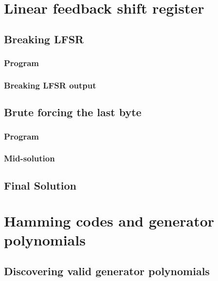 \documentclass[pdftex, 12pt, a4paper]{article}
\begin{document}
\pagebreak
\printbibliography

\pagebreak
\appendices
\section{Linear feedback shift register}
\subsection{Breaking LFSR}
\subsubsection{Program}\label{break-lfsr}

\pagebreak

\subsubsection{Breaking LFSR output}\label{break-lfsr-out}
\pagebreak

\subsection{Brute forcing the last byte}
\subsubsection{Program}\label{last-byte}

\pagebreak

\subsubsection{Mid-solution}\label{last-byte-out}

\subsection{Final Solution}\label{q1-solution}
\pagebreak

\section{Hamming codes and generator polynomials}
\subsection{Discovering valid generator polynomials}\label{hammgen}

\pagebreak
\end{document}
